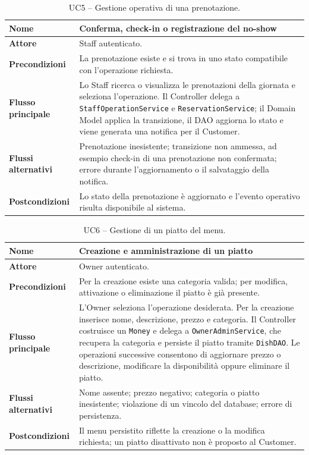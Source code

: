 \documentclass[12pt,a4paper]{article}
\newcommand{\code}[1]{\nolinkurl{#1}}
\begin{document}
\begin{longtable}{|>{\bfseries}p{3cm}|p{10.5cm}|}
\caption{UC5 -- Gestione operativa di una prenotazione.}\label{tab:uc-reservation-operation}\\
\hline
Nome & Conferma, check-in o registrazione del no-show \\
\hline
Attore & Staff autenticato. \\
\hline
Precondizioni & La prenotazione esiste e si trova in uno stato compatibile con l'operazione richiesta. \\
\hline
Flusso principale &
Lo Staff ricerca o visualizza le prenotazioni della giornata e seleziona
l'operazione. Il Controller delega a \code{StaffOperationService} e
\code{ReservationService}; il Domain Model applica la transizione, il DAO
aggiorna lo stato e viene generata una notifica per il Customer. \\
\hline
Flussi alternativi &
Prenotazione inesistente; transizione non ammessa, ad esempio check-in di una
prenotazione non confermata; errore durante l'aggiornamento o il salvataggio
della notifica. \\
\hline
Postcondizioni & Lo stato della prenotazione è aggiornato e l'evento operativo risulta disponibile al sistema. \\
\hline
\end{longtable}

\newpage
\begin{table}[H]
\centering
\caption{UC6 -- Gestione di un piatto del menu.}
\label{tab:uc-dish-management}
\begin{tabular}{|>{\bfseries}p{3cm}|p{10.5cm}|}
\hline
Nome & Creazione e amministrazione di un piatto \\
\hline
Attore & Owner autenticato. \\
\hline
Precondizioni & Per la creazione esiste una categoria valida; per modifica,
attivazione o eliminazione il piatto è già presente. \\
\hline
Flusso principale &
L'Owner seleziona l'operazione desiderata. Per la creazione inserisce nome,
descrizione, prezzo e categoria. Il Controller costruisce un \code{Money} e
delega a \code{OwnerAdminService}, che recupera la categoria e persiste il
piatto tramite \code{DishDAO}. Le operazioni successive consentono di aggiornare
prezzo o descrizione, modificare la disponibilità oppure eliminare il piatto. \\
\hline
Flussi alternativi &
Nome assente; prezzo negativo; categoria o piatto inesistente; violazione di un
vincolo del database; errore di persistenza. \\
\hline
Postcondizioni & Il menu persistito riflette la creazione o la modifica richiesta; un piatto disattivato non è proposto al Customer. \\
\hline
\end{tabular}
\end{table}
\end{document}
